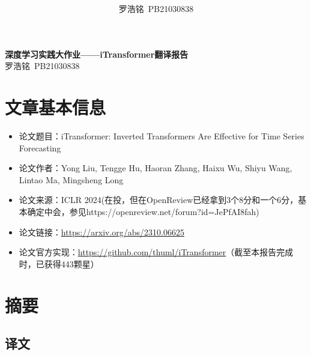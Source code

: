 \documentclass[twoside,12pt]{article}
\title{ }
\author{罗浩铭\ PB21030838}
\begin{document}
\fancyhf{} %
\fancyfoot[C]{\thepage} %
\fancyhead[l]{\footnotesize  }

\renewcommand{\headrulewidth}{0pt} %

\begin{center}
    \textbf{\LARGE{深度学习实践大作业——iTransformer翻译报告}}\\
    \vspace{0.2cm}
    \large{罗浩铭\ PB21030838}
\end{center}


\section{文章基本信息}

\begin{itemize}
    \item 论文题目：iTransformer: Inverted Transformers Are Effective for Time Series Forecasting
    \item 论文作者：Yong Liu, Tengge Hu, Haoran Zhang, Haixu Wu, Shiyu Wang, Lintao Ma, Mingsheng Long
    \item 论文来源：ICLR 2024(在投，但在OpenReview已经拿到3个8分和一个6分，基本确定中会，参见https://openreview.net/forum?id=JePfAI8fah)
    \item 论文链接：\url{https://arxiv.org/abs/2310.06625}
    \item 论文官方实现：\url{https://github.com/thuml/iTransformer}（截至本报告完成时，已获得443颗星）
\end{itemize}

\section{摘要}
\subsection{译文}
\end{document}
